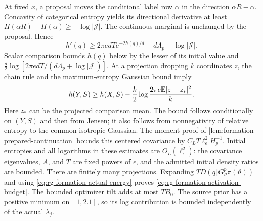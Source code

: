 At fixed $x$, a proposal moves the conditional label row $\alpha$
in the direction $\alpha R-\alpha$. Concavity of categorical
entropy yields its directional derivative at least
$H(\alpha R)-H(\alpha)\ge-\log|\mathcal J|$. The continuous
marginal is unchanged by the proposal. Hence
\begin{equation}
 h'(q)\ge 2\pi e d T e^{-2h(q)/d}
                -d\Lambda_p-\log|\mathcal J|.
 \label{eq:rg-formation-counting-entropy-floor}
\end{equation}
Scalar comparison bounds $h(q)$ below by the lesser of its initial
value and
$\frac d2\log[2\pi e dT/(d\Lambda_p+\log|\mathcal J|)]$.
At a projection dropping $k$ coordinates $z$, the chain rule and
the maximum-entropy Gaussian bound imply
\begin{equation}
 h(Y,S)\ge h(X,S)
       -\frac k2\log\frac{2\pi e \mathbb E|z-z_*|^2}{k}.
 \label{eq:rg-formation-entropy-projection}
\end{equation}
Here $z_*$ can be the projected comparison mean. The bound follows
conditionally on $(Y,S)$ and then from Jensen; it also follows from
nonnegativity of relative entropy to the common isotropic Gaussian.
The moment proof of
\cref{lem:formation-prepared-continuation} bounds this centered
covariance by $C_LT\ell_\epsilon^2H_p^{-1}$. Initial entropies and
all logarithms in these estimates are $O_L(\ell_\epsilon^2)$:
the covariance eigenvalues, $A$, and $T$ are fixed powers of
$\epsilon$, and the admitted initial density ratios are bounded.
There are finitely many projections. Expanding
$TD(q\Vert G_\vartheta^p\pi(\vartheta))$ and using
\cref{eq:rg-formation-actual-energy} proves
\cref{eq:rg-formation-activation-budget}. The bounded optimizer
tilt adds at most $TB_0$. The source prior has a positive minimum
on $[1,2.1]$, so its log contribution is bounded independently of
the actual $\lambda_j$.

